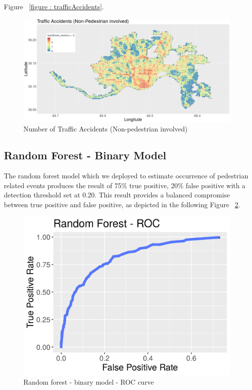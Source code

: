 \documentclass{llncs}
\begin{document}
Figure ~\ref{figure : trafficAccidents}. \newline
\FloatBarrier
\begin{figure}
 	\includegraphics[width=\textwidth, height=\textheight, keepaspectratio]{trafficAccidents.png}
 	\caption{Number of Traffic Accidents (Non-pedestrian involved)}
	\label{figure : busStopDistance}
\end{figure}
\FloatBarrier

\subsection{Random Forest - Binary Model}

The random forest model which we deployed to estimate occurrence of pedestrian related events produces the result of 75\% true positive, 20\% false positive with a detection threshold set at 0.20. This result provides a balanced compromise between true positive and false positive, as depicted in the following Figure ~\ref{figure : rfroccurve}. \newline
\FloatBarrier
\begin{figure}
 	\includegraphics[width=\textwidth, height=\textheight, keepaspectratio]{RFROC.png}
 	\caption{Random forest - binary model - ROC curve}
	\label{figure : rfroccurve}
\end{figure}
\FloatBarrier
\end{document}
